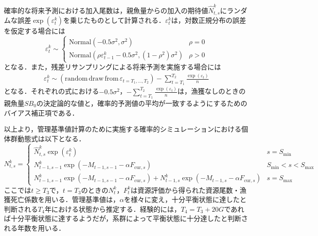 \documentclass[11pt]{jsarticle}
\begin{document}
確率的な将来予測における加入尾数は，親魚量からの加入の期待値$\hat{N}_{t, s}^k$にランダムな誤差$\exp (\varepsilon_t^k)$を乗じたものとして計算される．$\varepsilon_t^k$は，対数正規分布の誤差を仮定する場合には
\begin{equation}
  \varepsilon_t^k \sim \begin{cases}
    \mathrm{Normal} (-0.5\sigma^2,\sigma^2 ) & \rho=0 \\
    \mathrm{Normal} (\rho \varepsilon_{t-1}^k - 0.5\sigma^2,(1-\rho^2) \sigma^2) & \rho>0
  \end{cases}
  \label{epsilon1}
\end{equation}
となる．また，残差リサンプリングによる将来予測を実施する場合には
\begin{eqnarray}
  \varepsilon_t^k \sim (\mathrm{random} \, \mathrm{draw} \, \mathrm{from} \, \varepsilon_{t={T_1,…,T_2}})-\sum_{t=T_1}^{T_2} \frac{\exp(\varepsilon_t)}{n}
  \label{epsilon2}  
\end{eqnarray}
となる．それぞれの式における$-0.5\sigma^2$，$-\sum_{t=T_1}^{T_2} \frac{\exp(\varepsilon_t)}{n}$は，漁獲なしのときの親魚量$S\!B_0$の決定論的な値と，確率的予測値の平均が一致するようにするためのバイアス補正項である．

以上より，管理基準値計算のために実施する確率的シミュレーションにおける個体群動態式は以下となる．
\begin{equation}
  N_{t,s}^k = \begin{cases}
    \hat{N}_{t, s}^k \exp (\varepsilon_t^k) &     s = S_\mathrm{min} \\    
      N_{t-1, s-1}^k  \exp(-M_{t-1,s-1}-\alpha F_{\mathrm{cur},s} )  &    S_\mathrm{min} < s < S_\mathrm{max} \\
      N_{t-1, s-1}^k  \exp(-M_{t-1,s-1}-\alpha F_{\mathrm{cur},s} ) + N_{t-1,s}^k  \exp(-M_{t-1,s} - \alpha F_{\mathrm{cur},s} ) &   s=S_{\mathrm{max}}
  \end{cases}
  \label{future_eq2}
\end{equation}
ここでは$t \geq T_3$で，$t=T_3$のときの$N_t^k$，$F_t^k$は資源評価から得られた資源尾数・漁獲死亡係数を用いる．管理基準値は，$\alpha$を様々に変え，十分平衡状態に達したと判断される$T_4$年における状態から推定する．経験的には，$T_4=T_3+20G$であれば十分平衡状態に達するようだが，系群によって平衡状態に十分達したと判断される年数を用いる．
\end{document}
